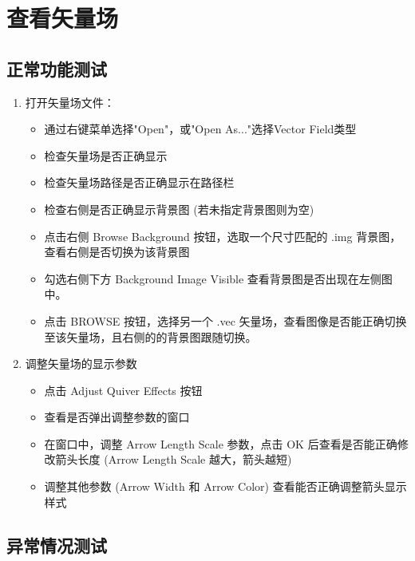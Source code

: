 \documentclass[a4paper,12pt]{report}	%
\begin{document}
\section{查看矢量场}

\subsection{正常功能测试}

\begin{enumerate}
    \item 打开矢量场文件：
    \begin{itemize}
        \item 通过右键菜单选择"Open"，或"Open As..."选择Vector Field类型
        \item 检查矢量场是否正确显示
        \item 检查矢量场路径是否正确显示在路径栏
        \item 检查右侧是否正确显示背景图 (若未指定背景图则为空)
        \item 点击右侧 Browse Background 按钮，选取一个尺寸匹配的 .img 背景图，查看右侧是否切换为该背景图
        \item 勾选右侧下方 Background Image Visible 查看背景图是否出现在左侧图中。
        \item 点击 BROWSE 按钮，选择另一个 .vec 矢量场，查看图像是否能正确切换至该矢量场，且右侧的的背景图跟随切换。
    \end{itemize}

    \item 调整矢量场的显示参数 
    \begin{itemize}
        \item 点击 Adjust Quiver Effects 按钮 
        \item 查看是否弹出调整参数的窗口 
        \item 在窗口中，调整 Arrow Length Scale 参数，点击 OK 后查看是否能正确修改箭头长度 (Arrow Length Scale 越大，箭头越短)
        \item 调整其他参数 (Arrow Width 和 Arrow Color) 查看能否正确调整箭头显示样式  
    \end{itemize}
\end{enumerate}

\subsection{异常情况测试} 
\end{document}
